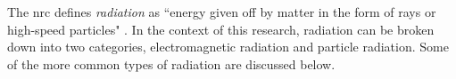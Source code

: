 \documentclass[../../../../main.tex]{subfiles}
\begin{document}
%
    \Xsubsubsection%
    The \gls{nrc} defines \textit{\gls{radiation}} as ``energy given off by matter in the form of rays or high-speed particles" \cite{website:Nuclear_Regulatory_Commission}.
    In the context of this research, radiation can be broken down into two categories, electromagnetic radiation and particle radiation.    
    Some of the more common types of radiation are discussed below.
\end{document}

